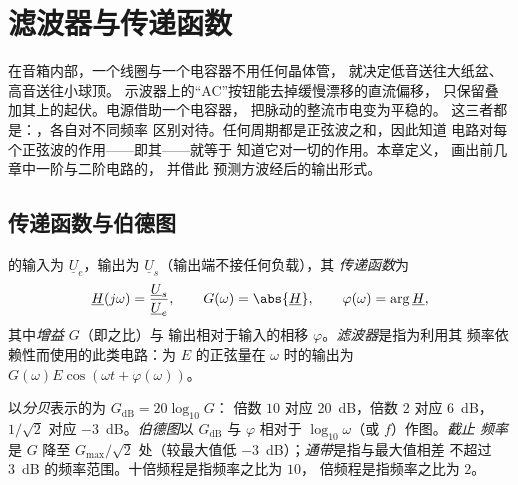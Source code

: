 \chapter{滤波器与传递函数}\label{ch:b1:filters-transfer-functions}

在音箱内部，一个线圈与一个电容器不用任何晶体管，
就决定低音送往大纸盆、高音送往小球顶。
示波器上的“AC”按钮能去掉缓慢漂移的直流偏移，
只保留叠加其上的起伏。电源借助一个电容器，
把脉动的整流市电变为平稳的。
这三者都是\emph{}：，各自对不同频率
区别对待。任何周期都是正弦波之和，因此知道
电路对每个正弦波的作用——即其——就等于
知道它对一切的作用。本章定义，
画出前几章中一阶与二阶电路的，
并借此
预测方波经后的输出形式。

\section{传递函数与伯德图}

\begin{definition}[传递函数]\label{def:b1:filters-transfer-functions:H}
的输入为 $\underline U_e$，输出为
$\underline U_s$（输出端不接任何负载），其
\emph{传递函数}为
\[
\underline H(j\omega) = \frac{\underline U_s}{\underline U_e},
\qquad G(\omega) = \abs{\underline H}, \qquad \varphi(\omega) = \arg\underline H,
\]
其中\emph{增益} $G$（即之比）与
输出相对于输入的相移 $\varphi$。\emph{滤波器}是指为利用其
频率依赖性而使用的此类电路：为 $E$ 的正弦量在
$\omega$ 时的输出为 $G(\omega)E\cos(\omega t + \varphi(\omega))$。
\end{definition}

\begin{definition}[分贝；伯德图]\label{def:b1:filters-transfer-functions:bode}
以\emph{分贝}表示的为 $G_{\mathrm{dB}} = 20\log_{10}G$：
倍数 $10$ 对应 \qty{20}{dB}，倍数 $2$ 对应 \qty{6}{dB}，$1/\sqrt2$ 对应
\qty{-3}{dB}。\emph{伯德图}以 $G_{\mathrm{dB}}$ 与
$\varphi$ 相对于 $\log_{10}\omega$（或 $f$）作图。\emph{截止
频率}是 $G$ 降至 $G_{\max}/\sqrt2$ 处（较最大值低
\qty{-3}{dB}）；\emph{通带}是指与最大值相差
不超过 \qty{3}{dB} 的频率范围。十倍频程是指频率之比为 $10$，
倍频程是指频率之比为 $2$。
\end{definition}

